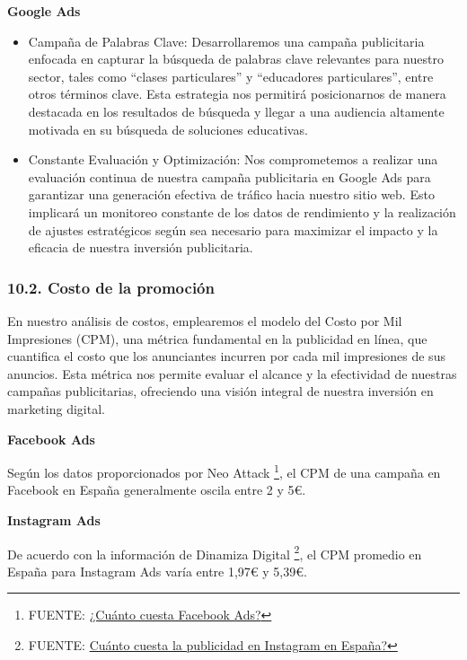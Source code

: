 \documentclass[
]{article}
\providecommand{\tightlist}{%
  \setlength{\itemsep}{0pt}\setlength{\parskip}{0pt}}
\begin{document}
\textbf{Google Ads}

\begin{itemize}
\tightlist
\item
  Campaña de Palabras Clave: Desarrollaremos una campaña publicitaria
  enfocada en capturar la búsqueda de palabras clave relevantes para
  nuestro sector, tales como ``clases particulares'' y ``educadores
  particulares'', entre otros términos clave. Esta estrategia nos
  permitirá posicionarnos de manera destacada en los resultados de
  búsqueda y llegar a una audiencia altamente motivada en su búsqueda de
  soluciones educativas.
\item
  Constante Evaluación y Optimización: Nos comprometemos a realizar una
  evaluación continua de nuestra campaña publicitaria en Google Ads para
  garantizar una generación efectiva de tráfico hacia nuestro sitio web.
  Esto implicará un monitoreo constante de los datos de rendimiento y la
  realización de ajustes estratégicos según sea necesario para maximizar
  el impacto y la eficacia de nuestra inversión publicitaria.
\end{itemize}

\subsubsection{10.2. Costo de la
promoción}\label{costo-de-la-promociuxf3n}

En nuestro análisis de costos, emplearemos el modelo del Costo por Mil
Impresiones (CPM), una métrica fundamental en la publicidad en línea,
que cuantifica el costo que los anunciantes incurren por cada mil
impresiones de sus anuncios. Esta métrica nos permite evaluar el alcance
y la efectividad de nuestras campañas publicitarias, ofreciendo una
visión integral de nuestra inversión en marketing digital.

\textbf{Facebook Ads}

Según los datos proporcionados por Neo Attack \footnote{FUENTE:
  \href{https://neoattack.com/blog/cuanto-cuesta-facebook-ads/\#:~:text=tipo\%20de\%20empresas.-,Cu\%C3\%A1nto\%20cuesta\%20Facebook\%20Ads\%20en\%20Espa\%C3\%B1a,entre\%200.5\%20y\%203\%E2\%82\%AC.}{¿Cuánto
  cuesta Facebook Ads?}}, el CPM de una campaña en Facebook en España
generalmente oscila entre 2 y 5€.

\textbf{Instagram Ads}

De acuerdo con la información de Dinamiza Digital \footnote{FUENTE:
  \href{https://dinamizadigital.com/cuanto-cuesta-la-publicidad-en-instagram/}{Cuánto
  cuesta la publicidad en Instagram en España?}}, el CPM promedio en
España para Instagram Ads varía entre 1,97€ y 5,39€.
\end{document}
